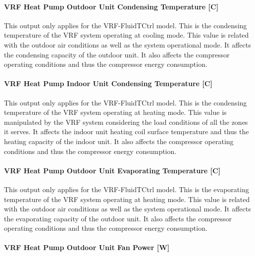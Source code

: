 \paragraph{VRF Heat Pump Outdoor Unit Condensing Temperature {[}C{]}}\label{vrf-heat-pump-outdoor-unit-condensing-temperature-at-cooling-mode-c}

This output only applies for the VRF-FluidTCtrl model. This is the condensing temperature of the VRF system operating at cooling mode. This value is related with the outdoor air conditions as well as the system operational mode. It affects the condensing capacity of the outdoor unit. It also affects the compressor operating conditions and thus the compressor energy consumption.

\paragraph{VRF Heat Pump Indoor Unit Condensing Temperature {[}C{]}}\label{vrf-heat-pump-indoor-unit-condensing-temperature-at-heating-mode-c}

This output only applies for the VRF-FluidTCtrl model. This is the condensing temperature of the VRF system operating at heating mode. This value is manipulated by the VRF system considering the load conditions of all the zones it serves. It affects the indoor unit heating coil surface temperature and thus the heating capacity of the indoor unit. It also affects the compressor operating conditions and thus the compressor energy consumption.

\paragraph{VRF Heat Pump Outdoor Unit Evaporating Temperature {[}C{]}}\label{vrf-heat-pump-outdoor-unit-evaporating-temperature-at-heating-mode-c}

This output only applies for the VRF-FluidTCtrl model. This is the evaporating temperature of the VRF system operating at heating mode. This value is related with the outdoor air conditions as well as the system operational mode. It affects the evaporating capacity of the outdoor unit. It also affects the compressor operating conditions and thus the compressor energy consumption.

\paragraph{VRF Heat Pump Outdoor Unit Fan Power {[}W{]}}\label{vrf-heat-pump-outdoor-unit-fan-power-w}

